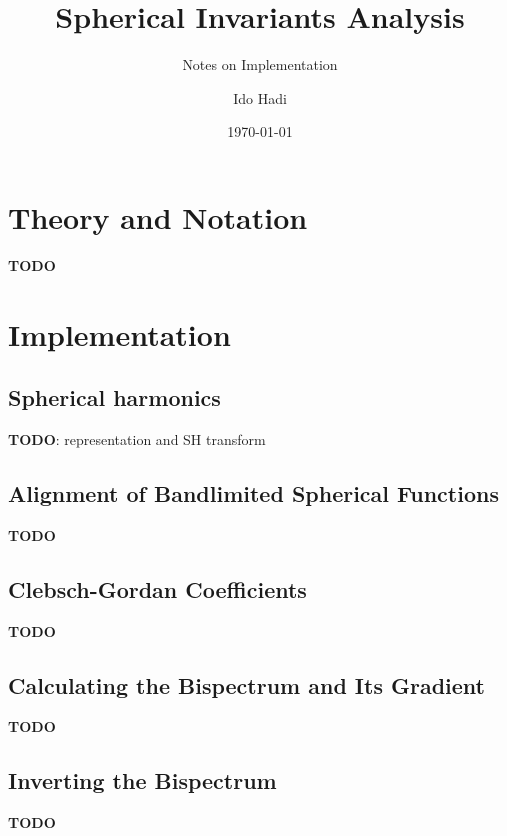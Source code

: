 \documentclass[a4paper,11pt]{scrartcl}
\title{Spherical Invariants Analysis}
\subtitle{Notes on Implementation}
\date{\today}
\author{Ido Hadi}
\begin{document}
	\maketitle
	
	\tableofcontents
	
	\section{Theory and Notation}
	\textbf{TODO}
	
	\section{Implementation}
	
	\subsection{Spherical harmonics}
	\textbf{TODO}: representation and SH transform 
	
	\subsection{Alignment of Bandlimited Spherical Functions}
	\textbf{TODO}
	
	\subsection{Clebsch-Gordan Coefficients}
	\textbf{TODO}
	
	\subsection{Calculating the Bispectrum and Its Gradient}
	\textbf{TODO}
	
	\subsection{Inverting the Bispectrum}
	\textbf{TODO}
	
	
	\printbibliography
	
\end{document}
